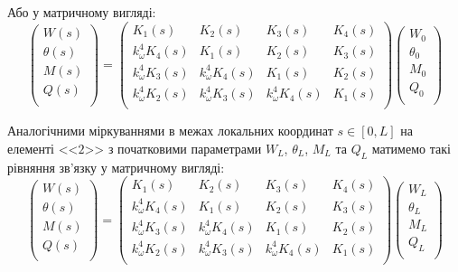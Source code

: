 Або у матричному вигляді:
\begin{equation}\label{eq: matrix field equations for element 1}
    \begin{pmatrix}
        W(s)      \\
        \theta(s) \\
        M(s)      \\
        Q(s)      \\
    \end{pmatrix} =
    \begin{pmatrix}
        K_1(s)              & K_2(s)              & K_3(s)              & K_4(s) \\
        k_{\omega}^4 K_4(s) & K_1(s)              & K_2(s)              & K_3(s) \\
        k_{\omega}^4 K_3(s) & k_{\omega}^4 K_4(s) & K_1(s)              & K_2(s) \\
        k_{\omega}^4 K_2(s) & k_{\omega}^4 K_3(s) & k_{\omega}^4 K_4(s) & K_1(s) \\
    \end{pmatrix}
    \begin{pmatrix}
        W_0      \\
        \theta_0 \\
        M_0      \\
        Q_0      \\
    \end{pmatrix}
\end{equation} 

Аналогічними міркуваннями в межах локальних координат $s \in [0,L]$ на елементі <<$2$>> з початковими параметрами $W_L$, $\theta_L$, $M_L$ та $Q_L$ матимемо такі рівняння зв'язку у матричному вигляді:
\begin{equation}\label{eq: matrix field equations for element 2}
    \begin{pmatrix}
        W(s)      \\
        \theta(s) \\
        M(s)      \\
        Q(s)      \\
    \end{pmatrix} =
    \begin{pmatrix}
        K_1(s)              & K_2(s)              & K_3(s)              & K_4(s) \\
        k_{\omega}^4 K_4(s) & K_1(s)              & K_2(s)              & K_3(s) \\
        k_{\omega}^4 K_3(s) & k_{\omega}^4 K_4(s) & K_1(s)              & K_2(s) \\
        k_{\omega}^4 K_2(s) & k_{\omega}^4 K_3(s) & k_{\omega}^4 K_4(s) & K_1(s) \\
    \end{pmatrix}
    \begin{pmatrix}
        W_L      \\
        \theta_L \\
        M_L      \\
        Q_L      \\
    \end{pmatrix}
\end{equation} 

